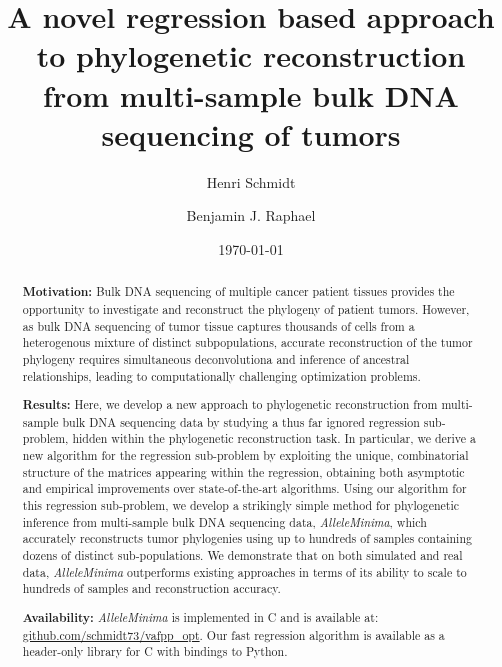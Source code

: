 \documentclass[10pt]{article}
\title{
    A novel regression based approach to phylogenetic reconstruction 
    from multi-sample bulk DNA sequencing of tumors
}
\author[1]{Henri Schmidt}
\author[1,$\dagger$]{Benjamin J. Raphael}
\affil[1]{Department of Computer Science, Princeton University, NJ, USA}
\affil[$\dagger$]{Correspondence: braphael@princeton.edu}
\date{\today}
\newcommand{\ourmethod}{\textit{AlleleMinima}\xspace}
\newcommand{\Rplus}{\protect\hspace{-.1em}\protect\raisebox{.35ex}{\smaller{\smaller\textbf{+}}}}
\newcommand{\Cpp}{\mbox{C\Rplus\Rplus}\xspace}
\begin{document}
\maketitle

\begin{abstract}
    \textbf{Motivation:} Bulk DNA sequencing of multiple cancer patient tissues provides the opportunity to 
    investigate and reconstruct the phylogeny of patient tumors. However, as 
    bulk DNA sequencing of tumor tissue captures thousands of cells from a heterogenous 
    mixture of distinct subpopulations, accurate reconstruction of the tumor phylogeny
    requires simultaneous deconvolutiona and inference of ancestral relationships, leading
    to computationally challenging optimization problems. 

    \textbf{Results:} Here, we develop a new
    approach to phylogenetic reconstruction from multi-sample bulk DNA sequencing data by 
    studying a thus far ignored regression sub-problem, hidden within the phylogenetic
    reconstruction task. In particular, we derive a new algorithm for the 
    regression sub-problem by exploiting the unique, combinatorial structure of the matrices
    appearing within the regression, obtaining both asymptotic and empirical improvements
    over state-of-the-art algorithms. Using our algorithm for this regression sub-problem,
    we develop a strikingly simple method for phylogenetic inference from multi-sample bulk 
    DNA sequencing data, \ourmethod, which accurately reconstructs tumor phylogenies 
    using up to hundreds of samples containing dozens of distinct sub-populations. We
    demonstrate that on both simulated and real data, \ourmethod outperforms existing approaches
    in terms of its ability to scale to hundreds of samples and reconstruction accuracy.

    \textbf{Availability:} \ourmethod is implemented in \Cpp and is available at: \url{github.com/schmidt73/vafpp_opt}. 
    Our fast regression algorithm is available as a header-only library for \Cpp with
    bindings to Python.
\end{abstract}
\end{document}
